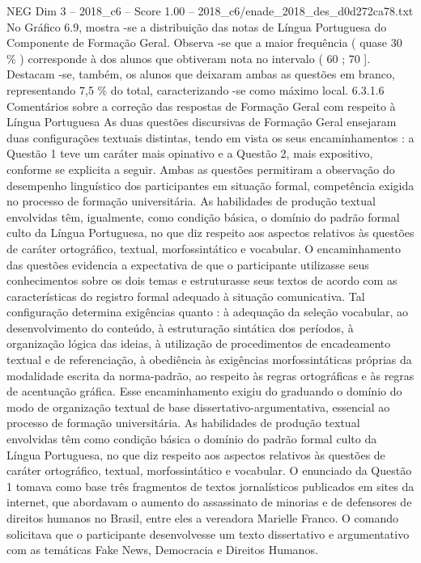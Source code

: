 \begin{textsample}{NEG Dim 3 – 2018\_c6 – Score 1.00 – 2018\_c6/enade\_2018\_des\_d0d272ca78.txt}
No Gráfico 6.9, mostra -se a distribuição das notas de Língua Portuguesa do Componente de Formação Geral.
Observa -se que a maior frequência ( quase 30 \% ) corresponde à dos alunos que obtiveram nota no intervalo ( 60 ; 70 ].
Destacam -se, também, os alunos que deixaram ambas as questões em branco, representando 7,5 \% do total, caracterizando -se como máximo local. 6.3.1.6 Comentários sobre a correção das respostas de Formação Geral com respeito à Língua Portuguesa As duas questões discursivas de Formação Geral ensejaram duas configurações textuais distintas, tendo em vista os seus encaminhamentos : a Questão 1 teve um caráter mais opinativo e a Questão 2, mais expositivo, conforme se explicita a seguir.
Ambas as questões permitiram a observação do desempenho linguístico dos participantes em situação formal, competência exigida no processo de formação universitária.
As habilidades de produção textual envolvidas têm, igualmente, como condição básica, o domínio do padrão formal culto da Língua Portuguesa, no que diz respeito aos aspectos relativos às questões de caráter ortográfico, textual, morfossintático e vocabular.
O encaminhamento das questões evidencia a expectativa de que o participante utilizasse seus conhecimentos sobre os dois temas e estruturasse seus textos de acordo com as características do registro formal adequado à situação comunicativa.
Tal configuração determina exigências quanto : à adequação da seleção vocabular, ao desenvolvimento do conteúdo, à estruturação sintática dos períodos, à organização lógica das ideias, à utilização de procedimentos de encadeamento textual e de referenciação, à obediência às exigências morfossintáticas próprias da modalidade escrita da norma-padrão, ao respeito às regras ortográficas e às regras de acentuação gráfica.
Esse encaminhamento exigiu do graduando o domínio do modo de organização textual de base dissertativo-argumentativa, essencial ao processo de formação universitária.
As habilidades de produção textual envolvidas têm como condição básica o domínio do padrão formal culto da Língua Portuguesa, no que diz respeito aos aspectos relativos às questões de caráter ortográfico, textual, morfossintático e vocabular.
O enunciado da Questão 1 tomava como base três fragmentos de textos jornalísticos publicados em sites da internet, que abordavam o aumento do assassinato de minorias e de defensores de direitos humanos no Brasil, entre eles a vereadora Marielle Franco.
O comando solicitava que o participante desenvolvesse um texto dissertativo e argumentativo com as temáticas Fake News, Democracia e Direitos Humanos.

\end{textsample}

